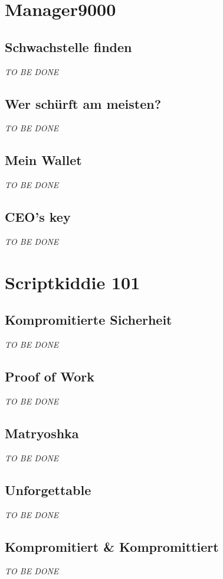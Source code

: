 \documentclass[12pt,a4paper,titlepage,oneside]{scrartcl}
\begin{document}
\section{Manager9000}

\subsection{Schwachstelle finden}
\emph{TO BE DONE}

\subsection{Wer schürft am meisten?}
\emph{TO BE DONE}

\subsection{Mein Wallet}
\emph{TO BE DONE}

\subsection{CEO's key}
\emph{TO BE DONE}

\section{Scriptkiddie 101}

\subsection{Kompromitierte Sicherheit}
\emph{TO BE DONE}

\subsection{Proof of Work}
\emph{TO BE DONE}

\subsection{Matryoshka}
\emph{TO BE DONE}

\subsection{Unforgettable}
\emph{TO BE DONE}

\subsection{Kompromitiert \& Kompromittiert}
\emph{TO BE DONE}
\end{document}
